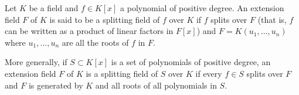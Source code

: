 Let $K$ be a field and $f \in K[x]$ a polynomial of positive degree. An extension field $F$ of $K$ is said to be a splitting field of $f$ over $K$ if $f$ splits over $F$ (that is, $f$ can be written as a product of linear factors in $F[x]$) and $F = K(u_1, \ldots, u_n)$ where $u_1, \ldots, u_n$ are all the roots of $f$ in $F$.

More generally, if $S \subset K[x]$ is a set of polynomials of positive degree, an extension field $F$ of $K$ is a splitting field of $S$ over $K$ if every $f \in S$ splits over $F$ and $F$ is generated by $K$ and all roots of all polynomials in $S$.
